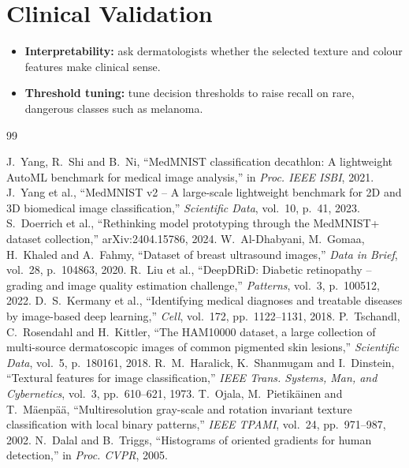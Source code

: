 \documentclass[12pt,a4paper]{report}
\begin{document}
\section{Clinical Validation}
\begin{itemize}
  \item \textbf{Interpretability:} ask dermatologists whether the selected texture and colour features make
        clinical sense.
  \item \textbf{Threshold tuning:} tune decision thresholds to raise recall on rare, dangerous classes such as
        melanoma.
\end{itemize}

\begin{thebibliography}{99}
 J.~Yang, R.~Shi and B.~Ni, ``MedMNIST classification decathlon: A lightweight AutoML benchmark for medical image analysis,'' in \emph{Proc. IEEE ISBI}, 2021.
 J.~Yang et al., ``MedMNIST v2 -- A large-scale lightweight benchmark for 2D and 3D biomedical image classification,'' \emph{Scientific Data}, vol.~10, p.~41, 2023.
 S.~Doerrich et al., ``Rethinking model prototyping through the MedMNIST+ dataset collection,'' arXiv:2404.15786, 2024.
 W.~Al-Dhabyani, M.~Gomaa, H.~Khaled and A.~Fahmy, ``Dataset of breast ultrasound images,'' \emph{Data in Brief}, vol.~28, p.~104863, 2020.
 R.~Liu et al., ``DeepDRiD: Diabetic retinopathy -- grading and image quality estimation challenge,'' \emph{Patterns}, vol.~3, p.~100512, 2022.
 D.~S.~Kermany et al., ``Identifying medical diagnoses and treatable diseases by image-based deep learning,'' \emph{Cell}, vol.~172, pp.~1122--1131, 2018.
 P.~Tschandl, C.~Rosendahl and H.~Kittler, ``The HAM10000 dataset, a large collection of multi-source dermatoscopic images of common pigmented skin lesions,'' \emph{Scientific Data}, vol.~5, p.~180161, 2018.
 R.~M.~Haralick, K.~Shanmugam and I.~Dinstein, ``Textural features for image classification,'' \emph{IEEE Trans. Systems, Man, and Cybernetics}, vol.~3, pp.~610--621, 1973.
 T.~Ojala, M.~Pietik\"ainen and T.~M\"aenp\"a\"a, ``Multiresolution gray-scale and rotation invariant texture classification with local binary patterns,'' \emph{IEEE TPAMI}, vol.~24, pp.~971--987, 2002.
 N.~Dalal and B.~Triggs, ``Histograms of oriented gradients for human detection,'' in \emph{Proc. CVPR}, 2005.

\end{thebibliography}
\end{document}

